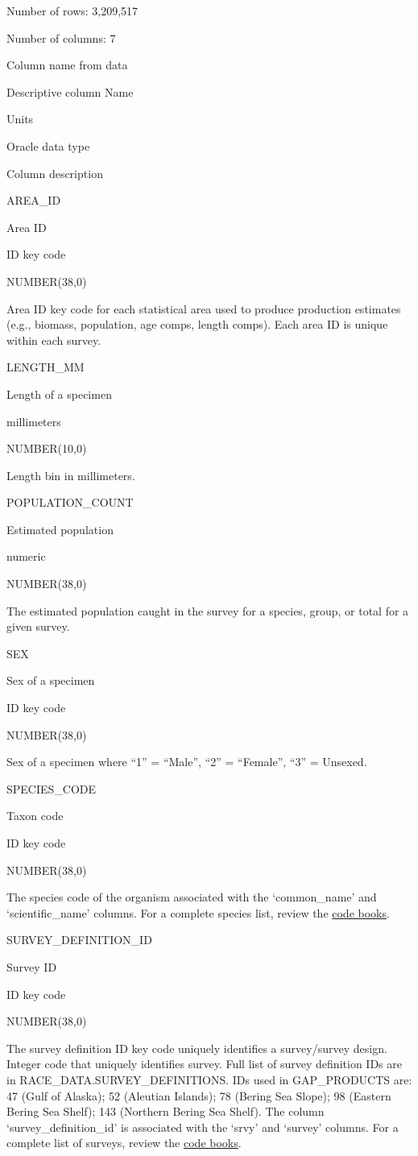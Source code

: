 \documentclass[
  letterpaper,
  oneside,
  open=any]{scrbook}
\begin{document}
Number of rows: 3,209,517

Number of columns: 7

Column name from data

Descriptive column Name

Units

Oracle data type

Column description

AREA\_ID

Area ID

ID key code

NUMBER(38,0)

Area ID key code for each statistical area used to produce production
estimates (e.g., biomass, population, age comps, length comps). Each
area ID is unique within each survey.

LENGTH\_MM

Length of a specimen

millimeters

NUMBER(10,0)

Length bin in millimeters.

POPULATION\_COUNT

Estimated population

numeric

NUMBER(38,0)

The estimated population caught in the survey for a species, group, or
total for a given survey.

SEX

Sex of a specimen

ID key code

NUMBER(38,0)

Sex of a specimen where ``1'' = ``Male'', ``2'' = ``Female'', ``3'' =
Unsexed.

SPECIES\_CODE

Taxon code

ID key code

NUMBER(38,0)

The species code of the organism associated with the `common\_name' and
`scientific\_name' columns. For a complete species list, review the
\href{https://www.fisheries.noaa.gov/resource/document/groundfish-survey-species-code-manual-and-data-codes-manual}{code
books}.

SURVEY\_DEFINITION\_ID

Survey ID

ID key code

NUMBER(38,0)

The survey definition ID key code uniquely identifies a survey/survey
design. Integer code that uniquely identifies survey. Full list of
survey definition IDs are in RACE\_DATA.SURVEY\_DEFINITIONS. IDs used in
GAP\_PRODUCTS are: 47 (Gulf of Alaska); 52 (Aleutian Islands); 78
(Bering Sea Slope); 98 (Eastern Bering Sea Shelf); 143 (Northern Bering
Sea Shelf). The column `survey\_definition\_id' is associated with the
`srvy' and `survey' columns. For a complete list of surveys, review the
\href{https://www.fisheries.noaa.gov/resource/document/groundfish-survey-species-code-manual-and-data-codes-manual}{code
books}.
\end{document}
